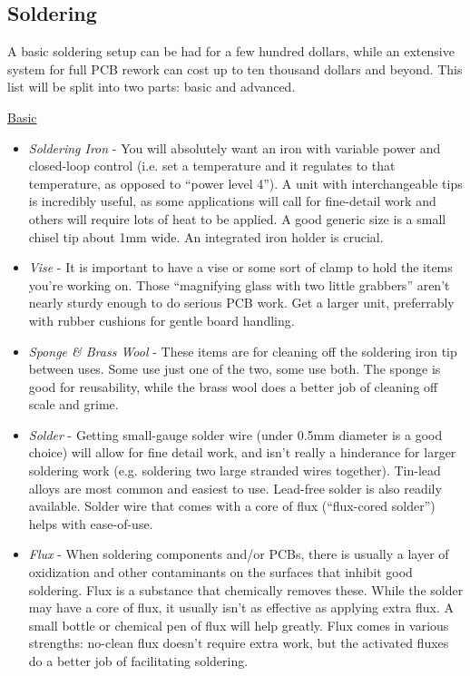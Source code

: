 \subsection{Soldering} %

A basic soldering setup can be had for a few hundred dollars, while an extensive system for full PCB rework can cost up to ten thousand dollars and beyond. This list will be split into two parts: basic and advanced.

\underline{Basic}

\begin{itemize}
\item \emph{Soldering Iron} - You will absolutely want an iron with variable power and closed-loop control (i.e. set a temperature and it regulates to that temperature, as opposed to ``power level 4''). A unit with interchangeable tips is incredibly useful, as some applications will call for fine-detail work and others will require lots of heat to be applied. A good generic size is a small chisel tip about 1mm wide. An integrated iron holder is crucial.
\item \emph{Vise} - It is important to have a vise or some sort of clamp to hold the items you're working on. Those ``magnifying glass with two little grabbers'' aren't nearly sturdy enough to do serious PCB work. Get a larger unit, preferrably with rubber cushions for gentle board handling.
\item \emph{Sponge \& Brass Wool} - These items are for cleaning off the soldering iron tip between uses. Some use just one of the two, some use both. The sponge is good for reusability, while the brass wool does a better job of cleaning off scale and grime.
\item \emph{Solder} - Getting small-gauge solder wire (under 0.5mm diameter is a good choice) will allow for fine detail work, and isn't really a hinderance for larger soldering work (e.g. soldering two large stranded wires together). Tin-lead alloys are most common and easiest to use. Lead-free solder is also readily available. Solder wire that comes with a core of flux (``flux-cored solder'') helps with ease-of-use.
\item \emph{Flux} - When soldering components and/or PCBs, there is usually a layer of oxidization and other contaminants on the surfaces that inhibit good soldering. Flux is a substance that chemically removes these. While the solder may have a core of flux, it usually isn't as effective as applying extra flux. A small bottle or chemical pen of flux will help greatly. Flux comes in various strengths: no-clean flux doesn't require extra work, but the activated fluxes do a better job of facilitating soldering.

\end{itemize}
